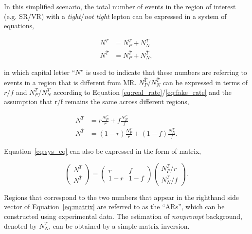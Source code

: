 In this simplified scenario, the total number of events in the region of interest (e.g. \ac{SR}/\ac{VR}) with a \emph{tight}/\emph{not tight} lepton can be expressed in a system of equations,

\begin{equation}
\begin{split}
N^{T}&=N_{P}^{T}+N_{N}^{T}\\
N^{\overline{T}}&=N_{P}^{\overline{T}}+N_{N}^{\overline{T}},
\end{split}
\end{equation}

in which capital letter ``$N$'' is used to indicate that these numbers are referring to events in a region that is different from \ac{MR}. $N_{P}^{\overline{T}}$/$N_{N}^{\overline{T}}$ can be expressed in terms of $r/f$ and $N_{P}^{T}$/$N_{N}^{T}$ according to Equation \ref{eq:real_rate}/\ref{eq:fake_rate} and the assumption that r/f remains the same across different regions,

\begin{equation}
\begin{split}
N^{T}&=r\frac{N_{P}^{T}}{r}+f\frac{N_{N}^{T}}{f}\\
N^{\overline{T}}&=(1-r)\frac{N_{P}^{T}}{r}+(1-f)\frac{N_{N}^{T}}{f}.
\end{split}
\label{eq:sys_eq}
\end{equation}

Equation~\ref{eq:sys_eq} can also be expressed in the form of matrix,

\begin{equation}
 \begin{pmatrix}
 N^{T}\\
 N^{\overline{T}}
 \end{pmatrix}=\begin{pmatrix}
r&f\\
1-r&1-f
 \end{pmatrix}\begin{pmatrix}
 N_{P}^{T}/r\\
 N_{N}^{T}/f
 \end{pmatrix}.
 \label{eq:matrix}
 \end{equation}
 
Regions that correspond to the two numbers that appear in the righthand side vector of Equation~\ref{eq:matrix} are referred to as the ``\acp{AR}'', which can be constructed using experimental data. The estimation of \emph{nonprompt} background, denoted by $N_{N}^T$, can be obtained by a simple matrix inversion. 

